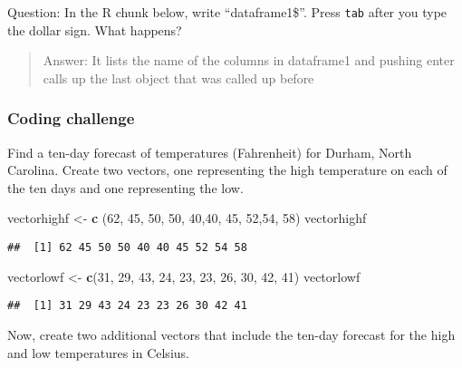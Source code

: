 \documentclass[]{article}
\newenvironment{Shaded}{\begin{snugshade}}{\end{snugshade}}
\newcommand{\KeywordTok}[1]{\textcolor[rgb]{0.13,0.29,0.53}{\textbf{#1}}}
\newcommand{\DecValTok}[1]{\textcolor[rgb]{0.00,0.00,0.81}{#1}}
\newcommand{\StringTok}[1]{\textcolor[rgb]{0.31,0.60,0.02}{#1}}
\newcommand{\NormalTok}[1]{#1}
\begin{document}
Question: In the R chunk below, write ``dataframe1\$''. Press
\texttt{tab} after you type the dollar sign. What happens?

\begin{quote}
Answer: It lists the name of the columns in dataframe1 and pushing enter
calls up the last object that was called up before
\end{quote}

\subsubsection{Coding challenge}\label{coding-challenge}

Find a ten-day forecast of temperatures (Fahrenheit) for Durham, North
Carolina. Create two vectors, one representing the high temperature on
each of the ten days and one representing the low.

\begin{Shaded}
\begin{Highlighting}[]
\NormalTok{vectorhighf <-}\StringTok{ }\KeywordTok{c}\NormalTok{ (}\DecValTok{62}\NormalTok{, }\DecValTok{45}\NormalTok{, }\DecValTok{50}\NormalTok{, }\DecValTok{50}\NormalTok{, }\DecValTok{40}\NormalTok{,}\DecValTok{40}\NormalTok{, }\DecValTok{45}\NormalTok{, }\DecValTok{52}\NormalTok{,}\DecValTok{54}\NormalTok{, }\DecValTok{58}\NormalTok{)}
\NormalTok{vectorhighf}
\end{Highlighting}
\end{Shaded}

\begin{verbatim}
##  [1] 62 45 50 50 40 40 45 52 54 58
\end{verbatim}

\begin{Shaded}
\begin{Highlighting}[]
\NormalTok{vectorlowf <-}\StringTok{ }\KeywordTok{c}\NormalTok{(}\DecValTok{31}\NormalTok{, }\DecValTok{29}\NormalTok{, }\DecValTok{43}\NormalTok{, }\DecValTok{24}\NormalTok{, }\DecValTok{23}\NormalTok{, }\DecValTok{23}\NormalTok{, }\DecValTok{26}\NormalTok{, }\DecValTok{30}\NormalTok{, }\DecValTok{42}\NormalTok{, }\DecValTok{41}\NormalTok{)}
\NormalTok{vectorlowf}
\end{Highlighting}
\end{Shaded}

\begin{verbatim}
##  [1] 31 29 43 24 23 23 26 30 42 41
\end{verbatim}

Now, create two additional vectors that include the ten-day forecast for
the high and low temperatures in Celsius.
\end{document}
